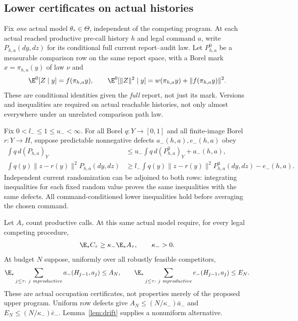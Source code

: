 \subsection*{Lower certificates on actual histories}\label{sec:lower-cert}
Fix \emph{one} actual model $\theta_*\in\Theta$, independent of the competing program. At each actual reached productive pre-call history $h$ and legal command $a$, write $P_{h,a}(dy,dz)$ for its conditional full current report--audit law. Let $P^0_{h,a}$ be a measurable comparison row on the same report space, with a Borel mark $x=\pi_{h,a}(y)$ of law $\nu$ and
\begin{equation}\label{eq:full-moments}
 \E^0[Z\mid y]=f(\pi_{h,a}y),\qquad
 \E^0[\|Z\|^2\mid y]=w(\pi_{h,a}y)+\|f(\pi_{h,a}y)\|^2.
\end{equation}
These are conditional identities given the \emph{full} report, not just its mark. Versions and inequalities are required on actual reachable histories, not only almost everywhere under an unrelated comparison path law.

Fix $0<l_-\le1\le u_-<\infty$. For all Borel $q:Y\to[0,1]$ and all finite-image Borel $r:Y\to H$, suppose predictable nonnegative defects $a_-(h,a),e_-(h,a)$ obey
\begin{align}
 \int q\,d(P_{h,a})_Y
 &\le u_-\int q\,d(P^0_{h,a})_Y+a_-(h,a),\label{eq:lower-mass}\\
 \int q(y)\|z-r(y)\|^2P_{h,a}(dy,dz)
 &\ge l_-\int q(y)\|z-r(y)\|^2P^0_{h,a}(dy,dz)-e_-(h,a).
 \label{eq:lower-task}
\end{align}
Independent current randomization can be adjoined to both rows: integrating inequalities for each fixed random value proves the same inequalities with the same defects. All command-conditioned lower inequalities hold before averaging the chosen command.

Let $A_\tau$ count productive calls. At this same actual model require, for every legal competing procedure,
\begin{equation}\label{eq:effort}
 \E_* C_\tau\ge\kappa_-\E_* A_\tau,\qquad\kappa_->0.
\end{equation}
At budget $N$ suppose, uniformly over all robustly feasible competitors,
\begin{equation}\label{eq:occupation}
 \E_*\sum_{j\le\tau:\ j\ {
m productive}}a_-(H_{j-1},a_j)\le A_N,
 \qquad
 \E_*\sum_{j\le\tau:\ j\ {
m productive}}e_-(H_{j-1},a_j)\le E_N.
\end{equation}
These are actual occupation certificates, not properties merely of the proposed upper program. Uniform row defects give $A_N\le(N/\kappa_-)\bar a_-$ and $E_N\le(N/\kappa_-)\bar e_-$. Lemma~\ref{lem:drift} supplies a nonuniform alternative.

